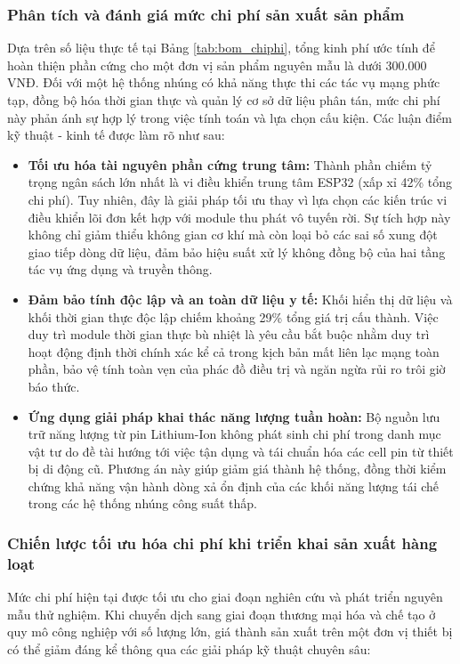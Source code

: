 \documentclass[12pt, a4paper, oneside]{article}
\begin{document}
\subsubsection{Phân tích và đánh giá mức chi phí sản xuất sản phẩm}
Dựa trên số liệu thực tế tại Bảng \ref{tab:bom_chiphi}, tổng kinh phí ước tính để hoàn thiện phần cứng cho một đơn vị sản phẩm nguyên mẫu là dưới 300.000 VNĐ. Đối với một hệ thống nhúng có khả năng thực thi các tác vụ mạng phức tạp, đồng bộ hóa thời gian thực và quản lý cơ sở dữ liệu phân tán, mức chi phí này phản ánh sự hợp lý trong việc tính toán và lựa chọn cấu kiện. Các luận điểm kỹ thuật - kinh tế được làm rõ như sau:

\begin{itemize}
    \item \textbf{Tối ưu hóa tài nguyên phần cứng trung tâm:} Thành phần chiếm tỷ trọng ngân sách lớn nhất là vi điều khiển trung tâm ESP32 (xấp xỉ 42\% tổng chi phí). Tuy nhiên, đây là giải pháp tối ưu thay vì lựa chọn các kiến trúc vi điều khiển lõi đơn kết hợp với module thu phát vô tuyến rời. Sự tích hợp này không chỉ giảm thiểu không gian cơ khí mà còn loại bỏ các sai số xung đột giao tiếp dòng dữ liệu, đảm bảo hiệu suất xử lý không đồng bộ của hai tầng tác vụ ứng dụng và truyền thông.
    \item \textbf{Đảm bảo tính độc lập và an toàn dữ liệu y tế:} Khối hiển thị dữ liệu và khối thời gian thực độc lập chiếm khoảng 29\% tổng giá trị cấu thành. Việc duy trì module thời gian thực bù nhiệt là yêu cầu bắt buộc nhằm duy trì hoạt động định thời chính xác kể cả trong kịch bản mất liên lạc mạng toàn phần, bảo vệ tính toàn vẹn của phác đồ điều trị và ngăn ngừa rủi ro trôi giờ báo thức.
    \item \textbf{Ứng dụng giải pháp khai thác năng lượng tuần hoàn:} Bộ nguồn lưu trữ năng lượng từ pin Lithium-Ion không phát sinh chi phí trong danh mục vật tư do đề tài hướng tới việc tận dụng và tái chuẩn hóa các cell pin từ thiết bị di động cũ. Phương án này giúp giảm giá thành hệ thống, đồng thời kiểm chứng khả năng vận hành dòng xả ổn định của các khối năng lượng tái chế trong các hệ thống nhúng công suất thấp.
\end{itemize}

\subsubsection{Chiến lược tối ưu hóa chi phí khi triển khai sản xuất hàng loạt}
Mức chi phí hiện tại được tối ưu cho giai đoạn nghiên cứu và phát triển nguyên mẫu thử nghiệm. Khi chuyển dịch sang giai đoạn thương mại hóa và chế tạo ở quy mô công nghiệp với số lượng lớn, giá thành sản xuất trên một đơn vị thiết bị có thể giảm đáng kể thông qua các giải pháp kỹ thuật chuyên sâu:
\end{document}
